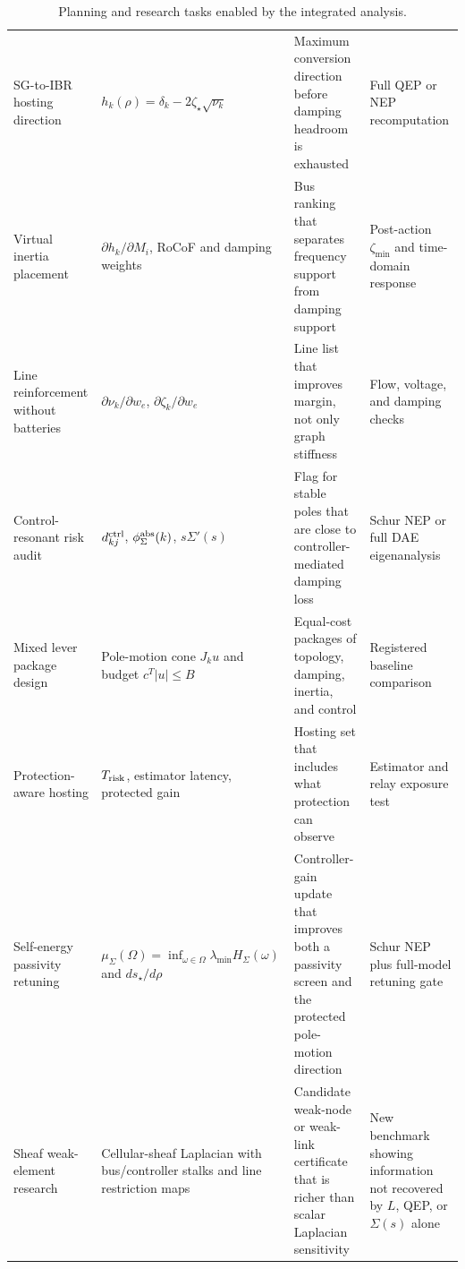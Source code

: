 \begin{table}[ht]
\centering
\small
\caption{Planning and research tasks enabled by the integrated analysis.}
\label{tab:analysis_enables}
\begin{tabular}{L{0.22\textwidth}L{0.25\textwidth}L{0.25\textwidth}L{0.16\textwidth}}
\toprule
{}
 &  &  & \\
\midrule
SG-to-IBR hosting direction &
\(h_k(\rho)=\delta_k-2\zeta_\star\sqrt{\nu_k}\) &
Maximum conversion direction before damping headroom is exhausted &
Full QEP or NEP recomputation\\
\addlinespace
Virtual inertia placement &
\(\partial h_k/\partial M_i\), RoCoF and damping weights &
Bus ranking that separates frequency support from damping support &
Post-action \(\zeta_{\min}\) and time-domain response\\
\addlinespace
Line reinforcement without batteries &
\(\partial\nu_k/\partial w_e\), \(\partial\zeta_k/\partial w_e\) &
Line list that improves margin, not only graph stiffness &
Flow, voltage, and damping checks\\
\addlinespace
Control-resonant risk audit &
\(d^{\rm ctrl}_{kj}\), \(\phi_\Sigma^{\rm abs}(k)\), \(s\Sigma'(s)\) &
Flag for stable poles that are close to controller-mediated damping loss &
Schur NEP or full DAE eigenanalysis\\
\addlinespace
Mixed lever package design &
Pole-motion cone \(J_ku\) and budget \(c^T|u|\le B\) &
Equal-cost packages of topology, damping, inertia, and control &
Registered baseline comparison\\
\addlinespace
Protection-aware hosting &
\(T_{\rm risk}\), estimator latency, protected gain &
Hosting set that includes what protection can observe &
Estimator and relay exposure test\\
\addlinespace
Self-energy passivity retuning &
\(\mu_\Sigma(\Omega)=\inf_{\omega\in\Omega}
\lambda_{\min}H_\Sigma(\omega)\) and \(ds_\star/d\rho\) &
Controller-gain update that improves both a passivity screen and the protected
pole-motion direction &
Schur NEP plus full-model retuning gate\\
\addlinespace
Sheaf weak-element research &
Cellular-sheaf Laplacian with bus/controller stalks and line restriction maps &
Candidate weak-node or weak-link certificate that is richer than scalar
Laplacian sensitivity &
New benchmark showing information not recovered by \(L\), QEP, or
\(\Sigma(s)\) alone\\
\bottomrule
\end{tabular}
\end{table}

